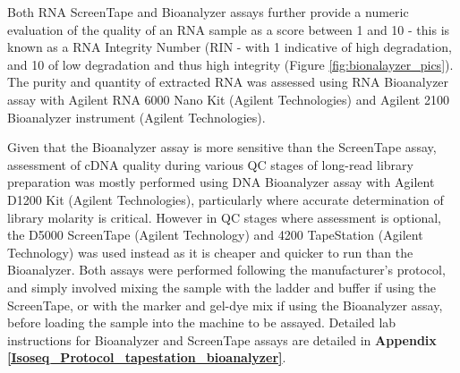 Both RNA ScreenTape and Bioanalyzer assays further provide a numeric evaluation of the quality of an RNA sample as a score between 1 and 10 - this is known as a RNA Integrity Number (RIN - with 1 indicative of high degradation, and 10 of low degradation and thus high integrity (Figure \ref{fig:bionalayzer_pics}). The purity and quantity of extracted RNA was assessed using RNA Bioanalyzer assay with Agilent RNA 6000 Nano Kit (Agilent Technologies) and Agilent 2100 Bioanalyzer instrument (Agilent Technologies). 

Given that the Bioanalyzer assay is more sensitive than the ScreenTape assay, assessment of cDNA quality during various QC stages of long-read library preparation was mostly performed using DNA Bioanalyzer assay with Agilent D1200 Kit (Agilent Technologies), particularly where accurate determination of library molarity is critical. However in QC stages where assessment is optional, the D5000 ScreenTape (Agilent Technology) and 4200 TapeStation (Agilent Technology) was used instead as it is cheaper and quicker to run than the Bioanalyzer. Both assays were performed following the manufacturer's protocol, and simply involved mixing the sample with the ladder and buffer if using the ScreenTape, or with the marker and gel-dye mix if using the Bioanalyzer assay, before loading the sample into the machine to be assayed. Detailed lab instructions for Bioanalyzer and ScreenTape assays are detailed in \textbf{Appendix \ref{Isoseq_Protocol_tapestation_bioanalyzer}}.  

